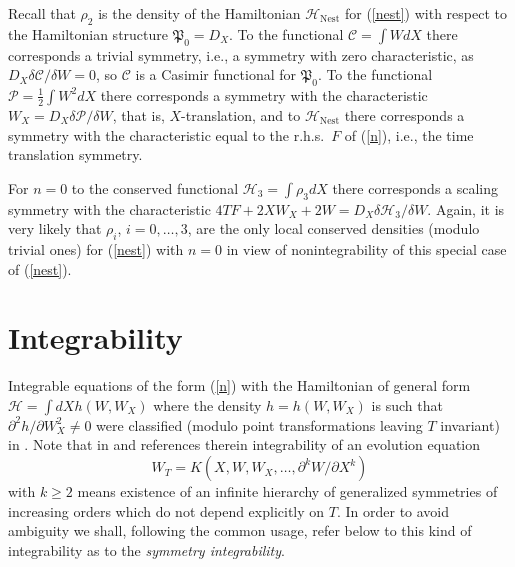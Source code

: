 \documentclass[12pt]{article}
\begin{document}
Recall that $\rho_2$ is the density of the Hamiltonian $\mathcal{H}_{\mathrm{Nest}}$ for (\ref{nest}) with respect to the Hamiltonian structure $\mathfrak{P}_0=D_X$. To the functional $\mathcal{C}=\displaystyle\int W dX$ there corresponds a trivial symmetry, i.e., a symmetry with zero characteristic, as $D_X \delta\mathcal{C}/\delta W=0$, so $\mathcal{C}$ is a Casimir functional for $\mathfrak{P}_0$. To the functional $\mathcal{P}=\frac12\displaystyle\int W^2dX$ there corresponds a symmetry with the characteristic $W_X=D_X\delta\mathcal{P}/\delta W$, that is, $X$-translation, and to $\mathcal{H}_{\mathrm{Nest}}$ there corresponds a symmetry with the characteristic equal to the r.h.s.\ $F$ of (\ref{n}), i.e., the time translation symmetry.


For $n=0$
to the conserved functional $\mathcal{H}_3=\displaystyle\int\rho_3 dX$ there corresponds a scaling symmetry with the characteristic $4T F+2 X W_X+2W=D_X\delta\mathcal{H}_3/\delta W$. Again, it is very likely that $\rho_i$, $i=0,\dots,3$, are the only local conserved densities (modulo trivial ones) for (\ref{nest}) with $n=0$ in view of nonintegrability of this special case of (\ref{nest}).


\section{Integrability}\label{sec:int}
Integrable equations of the form (\ref{n}) with the Hamiltonian of general form $\mathcal{H}=\displaystyle\int dX h(W,W_X)$
where the density $h=h(W,W_X)$ is such that $\partial^2 h/\partial  W_X^2\neq 0$ were classified (modulo point transformations leaving $T$ invariant) in \cite{ms}. Note that in \cite{mikshab, ms} and references therein integrability of an evolution equation
\begin{equation}\label{ee}
W_T=K(X,W,W_X,\dots,\partial^k W/\partial X^k)
\end{equation}
with $k\geq 2$ means existence of an infinite hierarchy of generalized symmetries of increasing orders which do not depend explicitly on $T$. In order to avoid ambiguity we shall, following the common usage, refer below to this kind of integrability as to the {\em symmetry integrability}.
\end{document}
